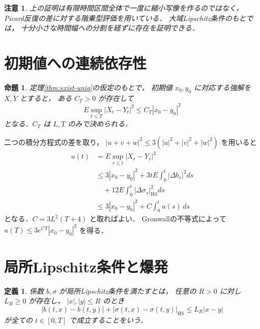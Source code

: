 \documentclass[a5paper,10pt,onecolumn]{jsarticle}
\makeatletter
\theoremstyle{mathnotetheorem}
\newtheorem{definition}[theorem]{定義}
\newtheorem{proposition}[theorem]{命題}
\newtheorem{remark}[theorem]{注意}
\renewcommand{\proofname}{証明}
\renewenvironment{proof}[1][\proofname]{%
  \par\pushQED{\qed}\normalfont\topsep4\p@\@plus2\p@\relax
  \trivlist\item[\hskip\labelsep\bfseries #1]\ignorespaces
}{\popQED\endtrivlist\@endpefalse}
\makeatother
\begin{document}
\begin{remark}
上の証明は有限時間区間全体で一度に縮小写像を作るのではなく，
Picard反復の差に対する階乗型評価を用いている．
大域Lipschitz条件のもとでは，
十分小さな時間幅への分割を経ずに存在を証明できる．
\end{remark}

\section{初期値への連続依存性}

\begin{proposition}\label{prop:stability}
定理\ref{thm:exist-uniq}の仮定のもとで，
初期値 $x_0,y_0$ に対応する強解を $X,Y$ とすると，
ある $C_T>0$ が存在して
\[
 E\sup_{t\le T}|X_t-Y_t|^2
 \le C_T|x_0-y_0|^2
\]
となる．$C_T$ は $L,T$ のみで決められる．
\end{proposition}
\begin{proof}
二つの積分方程式の差を取り，
$|u+v+w|^2\le3(|u|^2+|v|^2+|w|^2)$ を用いると
\begin{align*}
 u(t)&=E\sup_{r\le t}|X_r-Y_r|^2\\
 &\le3|x_0-y_0|^2
   +3tE\int_0^t|\Delta b_s|^2ds\\
 &\quad+12E\int_0^t|\Delta\sigma_s|_{\mathrm{HS}}^2ds\\
 &\le3|x_0-y_0|^2+C\int_0^tu(s)\,ds
\end{align*}
となる．$C=3L^2(T+4)$ と取ればよい．
Gronwallの不等式によって
$u(T)\le3e^{CT}|x_0-y_0|^2$ を得る．
\end{proof}

\section{局所Lipschitz条件と爆発}

\begin{definition}
係数 $b,\sigma$ が\emph{局所Lipschitz条件}を満たすとは，
任意の $R>0$ に対し $L_R\ge0$ が存在し，
$|x|,|y|\le R$ のとき
\[
 |b(t,x)-b(t,y)|
 +|\sigma(t,x)-\sigma(t,y)|_{\mathrm{HS}}
 \le L_R|x-y|
\]
が全ての $t\in[0,T]$ で成立することをいう．
\end{definition}
\end{document}
